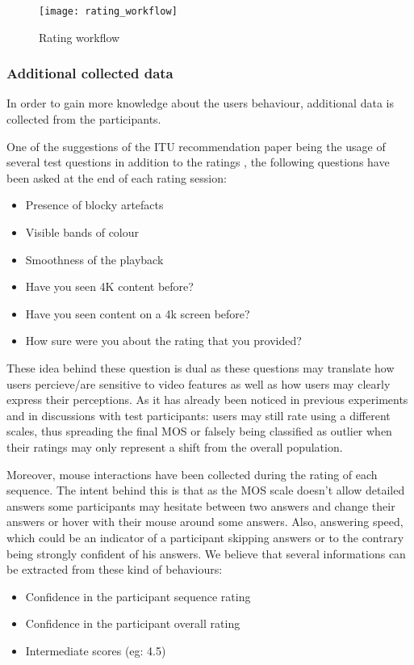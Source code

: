 \begin{figure}[h]
	\centering
	\texttt{[image: rating\_workflow]}
	\caption{Rating workflow}
	\label{fig:workflow:state_machine}
\end{figure}

\subsubsection{Additional collected data}
In order to gain more knowledge about the users behaviour, additional data is collected from the participants.

One of the suggestions of the ITU recommendation paper being the usage of several test questions in addition to the ratings \cite{rec1998p}, the following questions have been asked at the end of each rating session:

\begin{itemize}
	\item Presence of blocky artefacts
	\item Visible bands of colour
	\item Smoothness of the playback
	\item Have you seen 4K content before?
	\item Have you seen content on a 4k screen before?
	\item How sure were you about the rating that you provided?
\end{itemize}




These idea behind these question is dual as these questions may translate how users percieve/are sensitive to video features as well as how users may clearly express their perceptions. As it has already been noticed in previous experiments and in discussions with test participants: users may still rate using a different scales, thus spreading the final MOS or falsely being classified as outlier when their ratings may only represent a shift from the overall population. 

Moreover, mouse interactions have been collected during the rating of each sequence. The intent behind this is that as the MOS scale doesn't allow detailed answers some participants may hesitate between two answers and change their answers or hover with their mouse around some answers. Also, answering speed, which could be an indicator of a participant skipping answers or to the contrary being strongly confident of his answers. We believe that several informations can be extracted from these kind of behaviours:
\begin{itemize}
	\item Confidence in the participant sequence rating
	\item Confidence in the participant overall rating
	\item Intermediate scores (eg: 4.5)
\end{itemize}
